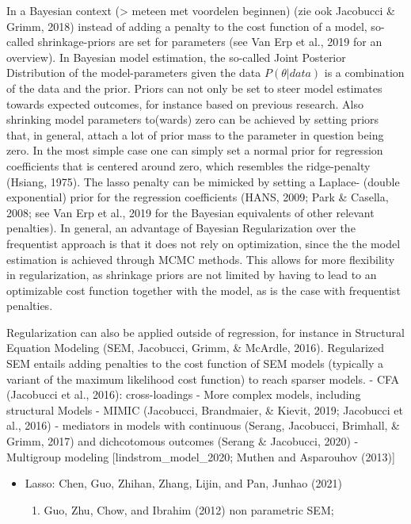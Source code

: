 \documentclass[
  man, donotrepeattitle,floatsintext]{apa6}
\providecommand{\tightlist}{%
  \setlength{\itemsep}{0pt}\setlength{\parskip}{0pt}}
\begin{document}
In a Bayesian context (\textgreater{} meteen met voordelen beginnen) (zie ook Jacobucci \& Grimm, 2018) instead of adding a penalty to the cost function of a model, so-called shrinkage-priors are set for parameters (see Van Erp et al., 2019 for an overview). In Bayesian model estimation, the so-called Joint Posterior Distribution of the model-parameters given the data \(P({\theta} | data)\) is a combination of the data and the prior. Priors can not only be set to steer model estimates towards expected outcomes, for instance based on previous research. Also shrinking model parameters to(wards) zero can be achieved by setting priors that, in general, attach a lot of prior mass to the parameter in question being zero. In the most simple case one can simply set a normal prior for regression coefficients that is centered around zero, which resembles the ridge-penalty (Hsiang, 1975). The lasso penalty can be mimicked by setting a Laplace- (double exponential) prior for the regression coefficients (HANS, 2009; Park \& Casella, 2008; see Van Erp et al., 2019 for the Bayesian equivalents of other relevant penalties). In general, an advantage of Bayesian Regularization over the frequentist approach is that it does not rely on optimization, since the the model estimation is achieved through MCMC methods. This allows for more flexibility in regularization, as shrinkage priors are not limited by having to lead to an optimizable cost function together with the model, as is the case with frequentist penalties.

Regularization can also be applied outside of regression, for instance in Structural Equation Modeling (SEM, Jacobucci, Grimm, \& McArdle, 2016). Regularized SEM entails adding penalties to the cost function of SEM models (typically a variant of the maximum likelihood cost function) to reach sparser models.
- CFA (Jacobucci et al., 2016): cross-loadings
- More complex models, including structural Models - MIMIC (Jacobucci, Brandmaier, \& Kievit, 2019; Jacobucci et al., 2016)
- mediators in models with continuous (Serang, Jacobucci, Brimhall, \& Grimm, 2017) and dichcotomous outcomes (Serang \& Jacobucci, 2020)
- Multigroup modeling {[}lindstrom\_model\_2020; Muthen and Asparouhov (2013){]}

\begin{itemize}
\tightlist
\item
  Lasso:
  Chen, Guo, Zhihan, Zhang, Lijin, and Pan, Junhao (2021)

  \begin{enumerate}
  \def\labelenumi{\arabic{enumi}.}
  \tightlist
  \item
    Guo, Zhu, Chow, and Ibrahim (2012) non parametric SEM;
  \end{enumerate}
\end{itemize}
\end{document}
